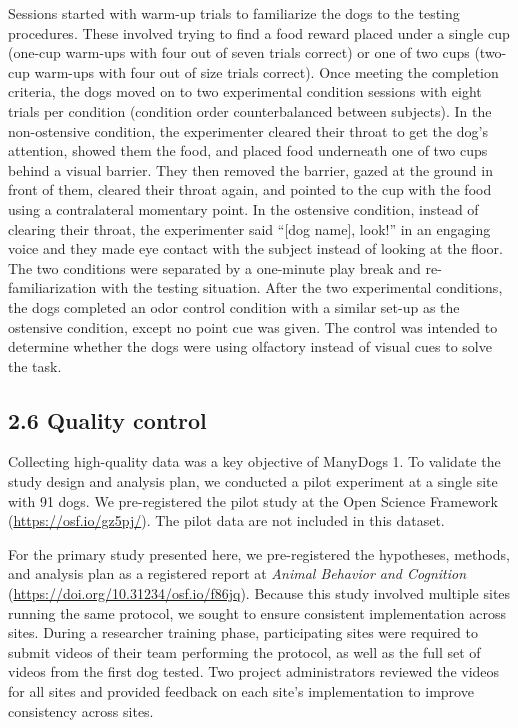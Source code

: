 \documentclass[
  pub,floatsintext]{apa6}
\begin{document}
Sessions started with warm-up trials to familiarize the dogs to the testing procedures. These involved trying to find a food reward placed under a single cup (one-cup warm-ups with four out of seven trials correct) or one of two cups (two-cup warm-ups with four out of size trials correct). Once meeting the completion criteria, the dogs moved on to two experimental condition sessions with eight trials per condition (condition order counterbalanced between subjects). In the non-ostensive condition, the experimenter cleared their throat to get the dog's attention, showed them the food, and placed food underneath one of two cups behind a visual barrier. They then removed the barrier, gazed at the ground in front of them, cleared their throat again, and pointed to the cup with the food using a contralateral momentary point. In the ostensive condition, instead of clearing their throat, the experimenter said ``{[}dog name{]}, look!'' in an engaging voice and they made eye contact with the subject instead of looking at the floor. The two conditions were separated by a one-minute play break and re-familiarization with the testing situation. After the two experimental conditions, the dogs completed an odor control condition with a similar set-up as the ostensive condition, except no point cue was given. The control was intended to determine whether the dogs were using olfactory instead of visual cues to solve the task.

\hypertarget{quality-control}{%
\subsection{2.6 Quality control}\label{quality-control}}

Collecting high-quality data was a key objective of ManyDogs 1. To validate the study design and analysis plan, we conducted a pilot experiment at a single site with 91 dogs. We pre-registered the pilot study at the Open Science Framework (\url{https://osf.io/gz5pj/}). The pilot data are not included in this dataset.

For the primary study presented here, we pre-registered the hypotheses, methods, and analysis plan as a registered report at \emph{Animal Behavior and Cognition} (\url{https://doi.org/10.31234/osf.io/f86jq}). Because this study involved multiple sites running the same protocol, we sought to ensure consistent implementation across sites. During a researcher training phase, participating sites were required to submit videos of their team performing the protocol, as well as the full set of videos from the first dog tested. Two project administrators reviewed the videos for all sites and provided feedback on each site's implementation to improve consistency across sites.
\end{document}
